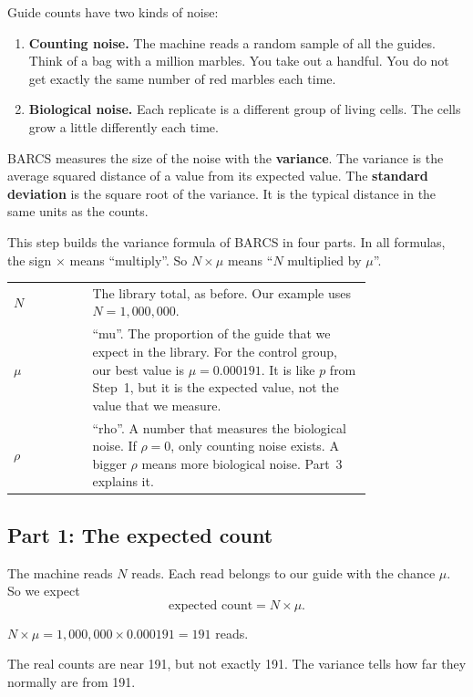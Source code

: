 Guide counts have two kinds of noise:

\begin{enumerate}
\item \textbf{Counting noise.} The machine reads a random sample of all
  the guides. Think of a bag with a million marbles. You take out a handful.
  You do not get exactly the same number of red marbles each time.
\item \textbf{Biological noise.} Each replicate is a different group of
  living cells. The cells grow a little differently each time.
\end{enumerate}

BARCS measures the size of the noise with the \textbf{variance}. The
variance is the average squared distance of a value from its expected
value. The \textbf{standard deviation} is the square root of the variance.
It is the typical distance in the same units as the counts.

This step builds the variance formula of BARCS in four parts. In all
formulas, the sign $\times$ means ``multiply''. So $N \times \mu$ means
``$N$ multiplied by $\mu$''.

\begin{symbols}
\begin{tabular}{@{}l p{0.78\linewidth}@{}}
$N$ & The library total, as before. Our example uses
      $N = 1{,}000{,}000$.\\
$\mu$ & ``mu''. The proportion of the guide that we expect in the library.
        For the control group, our best value is $\mu = 0.000191$. It is
        like $p$ from Step~1, but it is the expected value, not the value
        that we measure.\\
$\rho$ & ``rho''. A number that measures the biological noise. If
         $\rho = 0$, only counting noise exists. A bigger $\rho$ means more
         biological noise. Part~3 explains it.\\
\end{tabular}
\end{symbols}

\subsection{Part 1: The expected count}

The machine reads $N$ reads. Each read belongs to our guide with the chance
$\mu$. So we expect
\[
\text{expected count} = N \times \mu .
\]

\begin{worked}
$N \times \mu = 1{,}000{,}000 \times 0.000191 = 191$ reads.

The real counts are near 191, but not exactly 191. The variance tells how
far they normally are from 191.
\end{worked}

